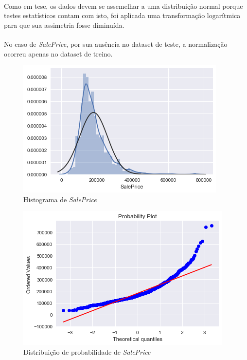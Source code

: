 \documentclass{article}
\begin{document}
			\paragraph{}Como em tese, os dados devem se assemelhar a uma distribuição normal porque testes estatísticos contam com isto, foi aplicada uma transformação logarítmica para que sua assimetria fosse diminuída.
			
			\paragraph{}No caso de \textit{SalePrice}, por sua ausência no dataset de teste, a normalização ocorreu apenas no dataset de treino.
			
			\begin{figure}[H]
				\centering
				\includegraphics[scale=0.8]{../img/saleprice_norm_1}
				\caption{Histograma de \textit{SalePrice}}
			\end{figure}

			\begin{figure}[H]
				\centering
				\includegraphics[scale=0.8]{../img/saleprice_norm_2}
				\caption{Distribuição de probabilidade de \textit{SalePrice}}
			\end{figure}
			
\end{document}
